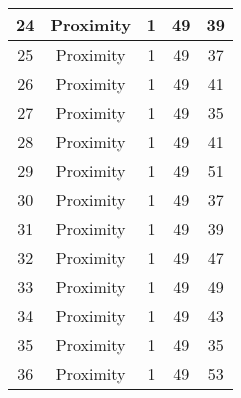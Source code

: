 \documentclass[results.tex]{subfiles}
\begin{document}
\begin{center}
\begin{tabular}{| c || c | c | c | c |}
            \hline
            24                      & Proximity                    & 1                      & 49                      & 39                   \\
            \hline
            25                      & Proximity                    & 1                      & 49                      & 37                   \\
            \hline
            26                      & Proximity                    & 1                      & 49                      & 41                   \\
            \hline
            27                      & Proximity                    & 1                      & 49                      & 35                   \\
            \hline
            28                      & Proximity                    & 1                      & 49                      & 41                   \\
            \hline
            29                      & Proximity                    & 1                      & 49                      & 51                   \\
            \hline
            30                      & Proximity                    & 1                      & 49                      & 37                   \\
            \hline
            31                      & Proximity                    & 1                      & 49                      & 39                   \\
            \hline
            32                      & Proximity                    & 1                      & 49                      & 47                   \\
            \hline
            33                      & Proximity                    & 1                      & 49                      & 49                   \\
            \hline
            34                      & Proximity                    & 1                      & 49                      & 43                   \\
            \hline
            35                      & Proximity                    & 1                      & 49                      & 35                   \\
            \hline
            36                      & Proximity                    & 1                      & 49                      & 53                   \\

\end{tabular}
\end{center}
\end{document}

